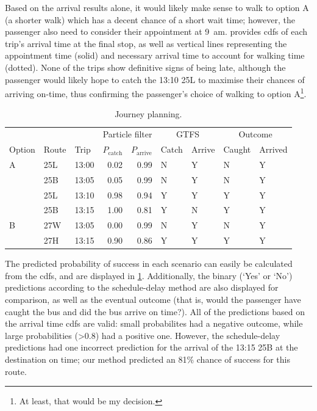 Based on the arrival results alone, it would likely make sense to walk to option A (a shorter walk) which has a decent chance of a short wait time; however, the passenger also need to consider their appointment at 9~am.  provides \glspl{cdf} of each trip's arrival time at the final stop, as well as vertical lines representing the appointment time (solid) and necessary arrival time to account for walking time (dotted). None of the trips show definitive signs of being late, although the passenger would likely hope to catch the 13:10 25L to maximise their chances of arriving on-time, thus confirming the passenger's choice of walking to option A\footnote{At least, that would be my decision.}.


\begin{knitrout}\small
{}\color{fgcolor}\begin{table}

\caption{\label{tab:eta_journey_results}Journey planning.}
\centering
\fontsize{8}{10}\selectfont
\begin{tabular}[t]{lllrrllll}
\toprule
\multicolumn{1}{c}{} & \multicolumn{1}{c}{} & \multicolumn{1}{c}{} & \multicolumn{2}{c}{Particle filter} & \multicolumn{2}{c}{GTFS} & \multicolumn{2}{c}{Outcome} \\
\cmidrule(l{3pt}r{3pt}){4-5} \cmidrule(l{3pt}r{3pt}){6-7} \cmidrule(l{3pt}r{3pt}){8-9}
Option & Route & Trip & $P_\text{catch}$ & $P_\text{arrive}$ & Catch & Arrive & Caught & Arrived\\
\midrule
A & 25L & 13:00 & 0.02 & 0.99 & N & Y & N & Y\\
 & 25B & 13:05 & 0.05 & 0.99 & N & Y & N & Y\\
 & 25L & 13:10 & 0.98 & 0.94 & Y & Y & Y & Y\\
 & 25B & 13:15 & 1.00 & 0.81 & Y & N & Y & Y\\
\midrule
B & 27W & 13:05 & 0.00 & 0.99 & N & Y & N & Y\\
 & 27H & 13:15 & 0.90 & 0.86 & Y & Y & Y & Y\\
\bottomrule
\end{tabular}
\end{table}


\end{knitrout}


The predicted probability of success in each scenario can easily be calculated from the \glspl{cdf}, and are displayed in \cref{tab:eta_journey_results}. Additionally, the binary (`Yes' or `No') predictions according to the schedule-delay method are also displayed for comparison, as well as the eventual outcome (that is, would the passenger have caught the bus and did the bus arrive on time?). All of the predictions based on the \pf{} arrival time \glspl{cdf} are valid: small probabilites had a negative outcome, while large probabilities (>0.8) had a positive one. However, the schedule-delay predictions had one incorrect prediction for the arrival of the 13:15 25B at the destination on time; our method predicted an 81\% chance of success for this route.







